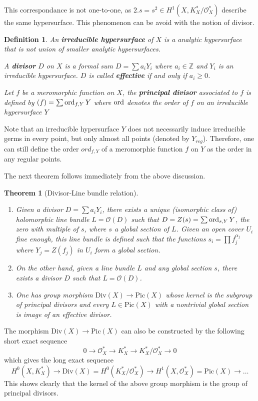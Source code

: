 \documentclass[11pt]{article}
\newtheorem{theorem}{Theorem}
\newtheorem{definition}{Definition}
\newcommand{\ord}{\mathop{\rm ord}\nolimits}
\begin{document}
This correspondance is not one-to-one, as \(2.s = s^2 \in H^1(X, K^*_X/\mathcal{O}_X^*)\) describe the same hypersurface. This phenomenon can be avoid with the notion of
divisor.

\begin{definition}
An \textbf{irreducible hypersurface} of \(X\) is a analytic hypersurface that is not union of
smaller analytic hypersurfaces.

A \textbf{divisor} \(D\) on \(X\) is a formal sum \(D = \sum a_i Y_i\) where \(a_i\in
\mathbb{Z}\) and \(Y_i\) is an irreducible hypersurface. \(D\) is called \textbf{effective}
if and only if \(a_i \geq 0\).

Let \(f\) be a meromorphic function on \(X\), the \textbf{principal divisor} associated to \(f\) is defined by \((f) = \sum \ord_{f,Y}Y\) where \(\ord\) denotes the order of \(f\) on an irreducible hypersurface \(Y\)
\end{definition}

Note that an irreducible hypersurface \(Y\) does not necessarily induce irreducible
germs in every point, but only almost all points (denoted by \(Y_{reg}\)). Therefore, one
can still define the order \(ord_{f,Y}\) of a meromorphic function \(f\) on \(Y\) as
the order in any regular points.

The next theorem follows immediately from the above discussion.
\begin{theorem}[Divisor-Line bundle relation]
\label{thm:div-pic-rel}
\begin{enumerate}
\item Given a divisor \(D = \sum a_i Y_i\), there exists a unique (isomorphic class of)
holomorphic line bundle \(L = \mathcal{O}(D)\) such that \(D =Z(s) = \sum \ord_{s,Y} Y\), the zero with
multiple of \(s\), where \(s\) a global section of \(L\). Given an open cover \(U_i\) fine enough, this line bundle is defined such that the functions \(s_i = \prod
   f_j^{\alpha_j}\) where \(Y_j = Z(f_j)\) in \(U_i\) form a global section.
\item On the other hand, given a line bundle \(L\) and any global section \(s\), there
exists a divisor \(D\) such that \(L = \mathcal{O}(D)\).
\item One has group morphism \(\text{Div}(X) \longrightarrow \text{Pic}(X)\) whose kernel
is the subgroup of principal divisors and every \(L\in \text{Pic}(X)\) with a
nontrivial global section is image of an effective divisor.
\end{enumerate}
\end{theorem}

The morphism \(\text{Div}(X) \longrightarrow \text{Pic}(X)\) can also be constructed by
the following short exact sequence
\[
0 \longrightarrow \mathcal{O}_X^* \longrightarrow K_X^* \longrightarrow K_X^*/
\mathcal{O}_X^* \longrightarrow 0
\]
which gives the long exact sequence
\[
H^0(X,K_X^*) \longrightarrow \text{Div}(X) = H^0(K_X^*/\mathcal{O}_X^*) \longrightarrow
H^1(X, \mathcal{O}_X^*) = \text{Pic}(X) \longrightarrow \dots
\]
This shows clearly that the kernel of the above group morphism is the group of principal divisors.
\end{document}
